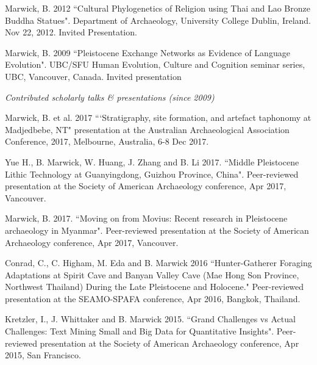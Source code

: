 \ind Marwick, B. 2012 ``Cultural Phylogenetics of Religion using Thai and Lao Bronze Buddha Statues". Department of Archaeology, University College Dublin, Ireland. Nov 22, 2012. Invited Presentation.

\ind Marwick, B. 2009 ``Pleistocene Exchange Networks as Evidence of Language Evolution".  UBC/SFU Human Evolution, Culture and Cognition seminar series, UBC, Vancouver, Canada. Invited presentation

\bigskip



\noindent\emph{Contributed scholarly talks \& presentations (since 2009)\vspace{0.01in}}

\medskip

\ind  Marwick, B. et al. 2017 ```Stratigraphy, site formation, and artefact taphonomy at Madjedbebe, NT"  presentation at the Australian Archaeological Association Conference, 2017, Melbourne, Australia, 6-8 Dec 2017.

\ind  Yue H., B. Marwick, W. Huang, J. Zhang and B. Li  2017. ``Middle Pleistocene Lithic Technology at Guanyingdong, Guizhou Province, China".  Peer-reviewed presentation at the Society of American Archaeology conference, Apr 2017, Vancouver.

\ind  Marwick, B. 2017. ``Moving on from Movius: Recent research in Pleistocene archaeology in Myanmar".  Peer-reviewed presentation at the Society of American Archaeology conference, Apr 2017, Vancouver.

\ind Conrad, C., C. Higham, M. Eda and B. Marwick 2016 ``Hunter-Gatherer Foraging Adaptations at Spirit Cave and Banyan Valley Cave (Mae Hong Son Province, Northwest Thailand) During the Late Pleistocene and Holocene." Peer-reviewed presentation at the SEAMO-SPAFA conference, Apr 2016, Bangkok, Thailand.

\ind Kretzler, I., J. Whittaker and B. Marwick 2015. ``Grand Challenges vs Actual Challenges: Text Mining Small and Big Data for Quantitative Insights".  Peer-reviewed presentation at the Society of American Archaeology conference, Apr 2015, San Francisco.

